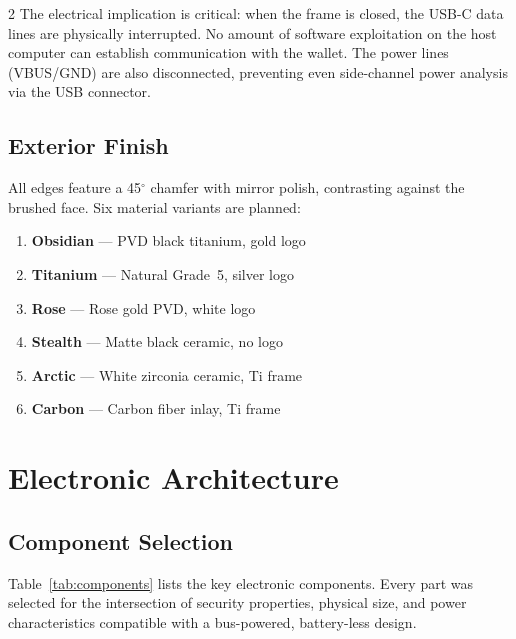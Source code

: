 \documentclass[11pt,a4paper]{article}
\begin{document}
\begin{multicols}{2}
The electrical implication is critical: when the frame is closed, the
USB-C data lines are physically interrupted. No amount of software
exploitation on the host computer can establish communication with the
wallet. The power lines (VBUS/GND) are also disconnected, preventing
even side-channel power analysis via the USB connector.

\subsection{Exterior Finish}

All edges feature a 45$^\circ$ chamfer with mirror polish, contrasting
against the brushed face. Six material variants are planned:

\begin{enumerate}[leftmargin=1.2em,itemsep=1pt]
  \item \textbf{Obsidian} --- PVD black titanium, gold logo
  \item \textbf{Titanium} --- Natural Grade~5, silver logo
  \item \textbf{Rose} --- Rose gold PVD, white logo
  \item \textbf{Stealth} --- Matte black ceramic, no logo
  \item \textbf{Arctic} --- White zirconia ceramic, Ti frame
  \item \textbf{Carbon} --- Carbon fiber inlay, Ti frame
\end{enumerate}

\section{Electronic Architecture}

\subsection{Component Selection}

Table~\ref{tab:components} lists the key electronic components. Every part
was selected for the intersection of security properties, physical size,
and power characteristics compatible with a bus-powered, battery-less
design.


\end{multicols}
\end{document}

